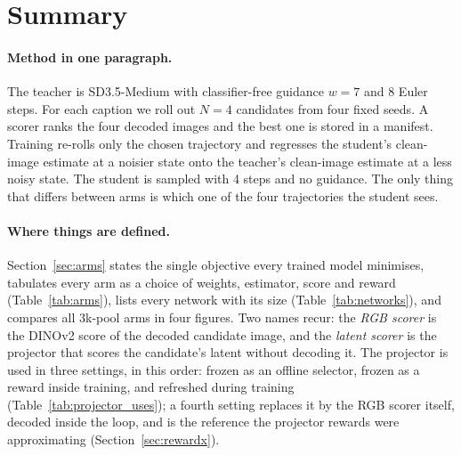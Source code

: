 \documentclass[11pt,a4paper]{article}
\begin{document}
\begin{abstract}
FID rather than adding cleanly; the same reward on two stronger teachers moves CompBench in the same direction as on the 8-step teacher but is not statistically resolved at three seeds. At the full 118k scale the reward (unmodified, $\lambda=15.504$) adds $+0.0087$ CompBench and $+1.45$ GenEval2 over argmax selection alone, every seed positive, and lowers CMMD by a further 0.10 on top of selection's own gain, confirming the 3k-scale result at 40 times the caption count. The same pipeline with VQAScore as the scorer gives similar gains but shares a model family with the evaluators. This document gives the full recipe: data, model, scorers, loss, hyperparameters, evaluation protocol, results, ablations and qualitative examples.
\end{abstract}

\tableofcontents

\section{Summary}

\paragraph{Method in one paragraph.}
The teacher is SD3.5-Medium with classifier-free guidance $w=7$ and 8 Euler steps. For each caption we roll out $N=4$ candidates from four fixed seeds. A scorer ranks the four decoded images and the best one is stored in a manifest. Training re-rolls only the chosen trajectory and regresses the student's clean-image estimate at a noisier state onto the teacher's clean-image estimate at a less noisy state. The student is sampled with 4 steps and no guidance. The only thing that differs between arms is which one of the four trajectories the student sees.

\paragraph{Where things are defined.} Section~\ref{sec:arms} states the single objective every trained model minimises, tabulates every arm as a choice of weights, estimator, score and reward (Table~\ref{tab:arms}), lists every network with its size (Table~\ref{tab:networks}), and compares all 3k-pool arms in four figures. Two names recur: the \emph{RGB scorer} is the DINOv2 score of the decoded candidate image, and the \emph{latent scorer} is the projector that scores the candidate's latent without decoding it. The projector is used in three settings, in this order: frozen as an offline selector, frozen as a reward inside training, and refreshed during training (Table~\ref{tab:projector_uses}); a fourth setting replaces it by the RGB scorer itself, decoded inside the loop, and is the reference the projector rewards were approximating (Section~\ref{sec:rewardx}).
\end{document}
